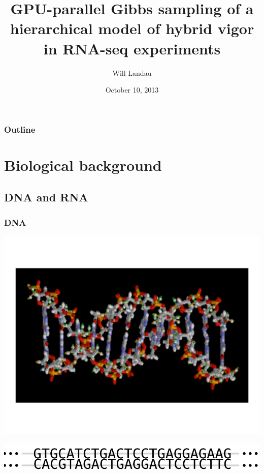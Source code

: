 \documentclass[handout]{beamer}
\title{GPU-parallel Gibbs sampling of a hierarchical model of hybrid vigor in RNA-seq experiments}
\author{Will Landau}
\date{October 10, 2013}
\institute{Iowa State University}
\numberwithin{equation}{section}
\begin{document}
\setcounter{subsection}{1}
\begin{frame}
\titlepage
 \end{frame}
 
\begin{frame}
\frametitle{Outline}
\tableofcontents
\end{frame}


\section{Biological background}

\subsection{DNA and RNA}


\begin{frame}
\frametitle{DNA}
\begin{center}
\includegraphics[scale=.23]{fig/dna-img}
\end{center}
\begin{center}
\includegraphics[scale=.23]{fig/dna.png}
\end{center}
\end{frame}
\end{document}
